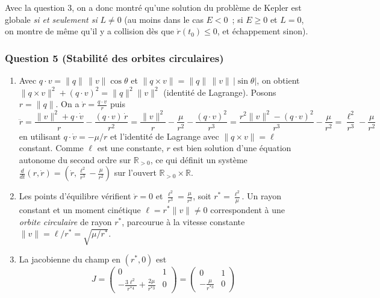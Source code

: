 Avec la question 3, on a donc montré qu'une solution du problème de
Kepler est globale \emph{si et seulement si} \(L\neq 0\) (au moins dans
le cas \(E<0\)~; si \(E\geq 0\) et \(L=0\), on montre de même qu'il y a
collision dès que \(\dot r(t_0)\leq 0\), et échappement sinon).

\hypertarget{answer-kepler-5}{%
\subsubsection*{Question 5 (Stabilité des orbites
circulaires)}\label{answer-kepler-5}}


\begin{enumerate}
\def\labelenumi{\alph{enumi})}
\item
  Avec \(q\cdot v = \|q\|\,\|v\|\cos\theta\) et
  \(\|q\times v\| = \|q\|\,\|v\|\,|\sin\theta|\), on obtient
  \(\|q\times v\|^2 + (q\cdot v)^2 = \|q\|^2\|v\|^2\) (identité de
  Lagrange). Posons \(r=\|q\|\). On a \(\dot r = \frac{q\cdot v}{r}\)
  puis \[
  \ddot r = \frac{\|v\|^2 + q\cdot\dot v}{r} - \frac{(q\cdot v)\,\dot r}{r^2}
  = \frac{\|v\|^2}{r} - \frac{\mu}{r^2} - \frac{(q\cdot v)^2}{r^3}
  = \frac{r^2\|v\|^2 - (q\cdot v)^2}{r^3} - \frac{\mu}{r^2}
  = \frac{\ell^2}{r^3} - \frac{\mu}{r^2}
  \] en utilisant \(q\cdot\dot v = -\mu/r\) et l'identité de Lagrange
  avec \(\|q\times v\| = \ell\) constant. Comme \(\ell\) est une
  constante, \(r\) est bien solution d'une équation autonome du second
  ordre sur \(\mathbb{R}_{>0}\), ce qui définit un système
  \(\frac{d}{dt}(r,\dot r) = \left(\dot r, \frac{\ell^2}{r^3}-\frac{\mu}{r^2}\right)\)
  sur l'ouvert \(\mathbb{R}_{>0}\times\mathbb{R}\).
\item
  Les points d'équilibre vérifient \(\dot r = 0\) et
  \(\frac{\ell^2}{r^3} = \frac{\mu}{r^2}\), soit
  \(r^* = \frac{\ell^2}{\mu}\). Un rayon constant et un moment cinétique
  \(\ell = r^*\|v\|\neq 0\) correspondent à une \emph{orbite circulaire}
  de rayon \(r^*\), parcourue à la vitesse constante
  \(\|v\| = \ell/r^* = \sqrt{\mu/r^*}\).
\item
  La jacobienne du champ en \((r^*,0)\) est \[
  J = \begin{pmatrix} 0 & 1 \\ -\frac{3\ell^2}{r^{*4}} + \frac{2\mu}{r^{*3}} & 0\end{pmatrix}
  = \begin{pmatrix} 0 & 1 \\ -\frac{\mu}{r^{*3}} & 0\end{pmatrix}
\]
\end{enumerate}
